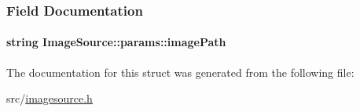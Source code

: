 \subsubsection{\-Field \-Documentation}
\hypertarget{structImageSource_1_1params_a624fa6b353bd075893ee53d83a1e5da0}{
\paragraph[{image\-Path}]{\setlength{\rightskip}{0pt plus 5cm}string {\bf \-Image\-Source\-::params\-::image\-Path}}}\label{structImageSource_1_1params_a624fa6b353bd075893ee53d83a1e5da0}


\-The documentation for this struct was generated from the following file\-:\begin{DoxyCompactItemize}
\item 
src/\hyperlink{imagesource_8h}{imagesource.\-h}\end{DoxyCompactItemize}
